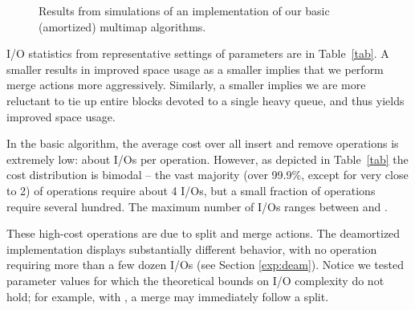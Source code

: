 \documentclass[11pt,letterpaper]{article}
\begin{document}
\newlength{\figwidth}
\setlength{\figwidth}{0.46\textwidth}
\begin{figure*}[!h]
\centering
{}
\caption{Results from simulations of an implementation of our basic (amortized) multimap algorithms.}
\end{figure*}


I/O statistics from representative settings of parameters are in Table~\ref{tab}. 
A smaller  results in improved space usage as a smaller  implies that we perform merge actions more aggressively. Similarly, a smaller  implies we are more reluctant to tie up entire blocks devoted to a single heavy queue, and thus yields improved space usage. 

In the basic algorithm, the average cost over all insert and remove operations is extremely low: about  I/Os per operation. However, as depicted in Table~\ref{tab} the cost distribution is bimodal -- the vast majority (over 99.9\%, except for  very close to 2) of operations require about 4 I/Os, but a small fraction of operations require several hundred. The maximum number of I/Os ranges between  and .

These high-cost operations are due to split and merge actions. 
The deamortized implementation displays substantially different behavior, with no operation requiring more than a few dozen I/Os (see Section \ref{exp:deam}).  Notice we tested parameter values for which the theoretical bounds on I/O complexity do not hold; for example, with , a merge may immediately follow a split.
\end{document}
